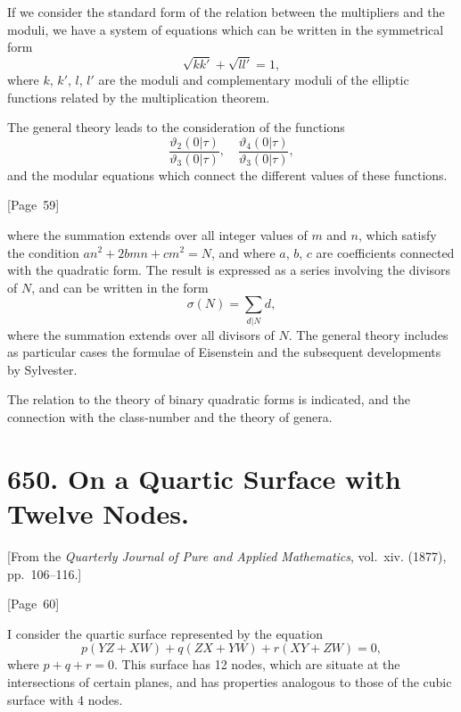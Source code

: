 \documentclass[11pt,a4paper]{book}
\begin{document}
If we consider the standard form of the relation between the
multipliers and the moduli, we have a system of equations which can be
written in the symmetrical form
\[
\sqrt{kk'} + \sqrt{ll'} = 1,
\]
where $k$, $k'$, $l$, $l'$ are the moduli and complementary moduli of
the elliptic functions related by the multiplication theorem.

The general theory leads to the consideration of the functions
\[
\frac{\vartheta_2(0|\tau)}{\vartheta_3(0|\tau)}, \quad
\frac{\vartheta_4(0|\tau)}{\vartheta_3(0|\tau)},
\]
and the modular equations which connect the different values of these
functions.

\begin{center}
[Page~59]
\end{center}

where the summation extends over all integer values of $m$ and $n$,
which satisfy the condition $an^2 + 2bmn + cm^2 = N$, and where $a$,
$b$, $c$ are coefficients connected with the quadratic form. The result
is expressed as a series involving the divisors of $N$, and can be
written in the form
\[
\sigma(N) = \sum_{d|N} d,
\]
where the summation extends over all divisors of $N$. The general
theory includes as particular cases the formulae of Eisenstein and the
subsequent developments by Sylvester.

The relation to the theory of binary quadratic forms is indicated, and
the connection with the class-number and the theory of genera.


\newpage
\section*{650. On a Quartic Surface with Twelve Nodes.}

[From the \textit{Quarterly Journal of Pure and Applied Mathematics},
vol.~xiv. (1877), pp.~106--116.]

\begin{center}
[Page~60]
\end{center}

I consider the quartic surface represented by the equation
\[
p(YZ + XW) + q(ZX + YW) + r(XY + ZW) = 0,
\]
where $p + q + r = 0$. This surface has 12 nodes, which are situate
at the intersections of certain planes, and has properties analogous
to those of the cubic surface with 4 nodes.
\end{document}

